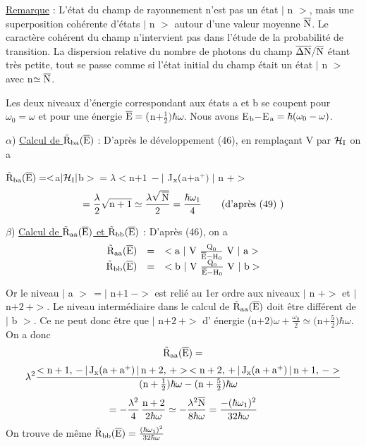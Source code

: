 \ul{Remarque} : L'état du champ de rayonnement n'est pas un état $|$ n $>$, mais une superposition
cohérente d'états $|$ n $>$ autour d'une valeur moyenne $\overline{\text{N}}$. Le caractère
cohérent du champ n'intervient pas dans l'étude de la probabilité de transition.
La dispersion relative du nombre de photons du champ $\overline{\Delta\text{N}}/\overline{\text{N}}$ étant très
petite, tout se passe comme si l'état initial du champ était un état $|$ n $>$
avec n$\simeq\overline{\text{N}}$.

Les deux niveaux d'énergie correspondant aux états a et b se coupent
pour $\omega_0=\omega$ et pour une énergie $\overline{\text{E}}=($n$+\frac{1}{2})\hbar\omega$.
Nous avons E$_{\text{b}}-$E$_{\text{a}}=\hbar(\omega_0-\omega)$.

$\alpha$) \ul{Calcul de $\tilde{\text{R}}_{\text{ba}}(\overline{\text{E}})$} : 
D'après le développement (46), en remplaçant V par $\mathcal{H}_{\text{I}}$ on a
\begin{center}
$\tilde{\text{R}}_{\text{ba}}(\overline{\text{E}})=<$a$|\mathcal{H}_{\text{I}}|$b$>=\lambda<$n$+1\ -|$ J$_{\text{x}}($a$+$a$^+)\;|$ n $+>$
\[
=\frac{\lambda}{2}\sqrt{\text{n}+1}\simeq\frac{\lambda\sqrt{\,\overline{\text{N}}}}{2}=\frac{\hbar\omega_1}{4}
\qquad\text{(d'après (49) )}
\]
\end{center}

$\beta$) \ul{Calcul de $\tilde{\text{R}}_{\text{aa}}(\overline{\text{E}})$ et $\tilde{\text{R}}_{\text{bb}}(\overline{\text{E}})$} : 
D'après (46), on a
\[
\begin{array}{rcl}
\tilde{\text{R}}_{\text{aa}}(\overline{\text{E}}) & = & 
<\text{a }|\text{ V }\frac{\text{Q}_0}{\overline{\text{E}}-\text{H}_0}\text{ V }|\text{ a}> \\
\tilde{\text{R}}_{\text{bb}}(\overline{\text{E}}) & = & 
<\text{b }|\text{ V }\frac{\text{Q}_0}{\overline{\text{E}}-\text{H}_0}\text{ V }|\text{ b}> \end{array}
\]

Or le niveau $|$ a $>\,=|$ n$+1\ ->$ est relié au 1er ordre aux niveaux $|$ n $+>$
et $|$ n$+2\ +>$. Le niveau intermédiaire dans le calcul de $\tilde{\text{R}}_{\text{aa}}(\overline{\text{E}})$
doit être différent de $|$ b $>$.
Ce ne peut donc être que $|$ n$+2\ +>$ d' énergie (n$+2)\omega+\frac{\omega_0}{2}\simeq($n$+\frac{5}{2})\hbar\omega$.
On a donc
\[
\tilde{\text{R}}_{\text{aa}}(\overline{\text{E}})=
\]
\[
\lambda^2\frac{<\text{n}+1,\,-\,|\,\text{J}_{\text{x}}(\text{a}+\text{a}^+)\,|
\,\text{n}+2,\,+>\,<\text{n}+2,\,+\,|\,\text{J}_{\text{x}}(\text{a}+\text{a}^+)\,|\,\text{n}+1,\,->}
{(\text{n}+\frac{1}{2})\hbar\omega-(\text{n}+\frac{5}{2})\hbar\omega}
\]
\[
=-\frac{\lambda^2}{4}\,\frac{\text{n}+2}{2\hbar\omega}\simeq-\frac{\lambda^2\overline{\text{N}}}{8\hbar\omega}
=\frac{-(\hbar\omega_1)^2}{32\hbar\omega}
\]
On trouve de même $\tilde{\text{R}}_{\text{bb}}(\overline{\text{E}})=\frac{(\hbar\omega_1)^2}{32\hbar\omega}$

